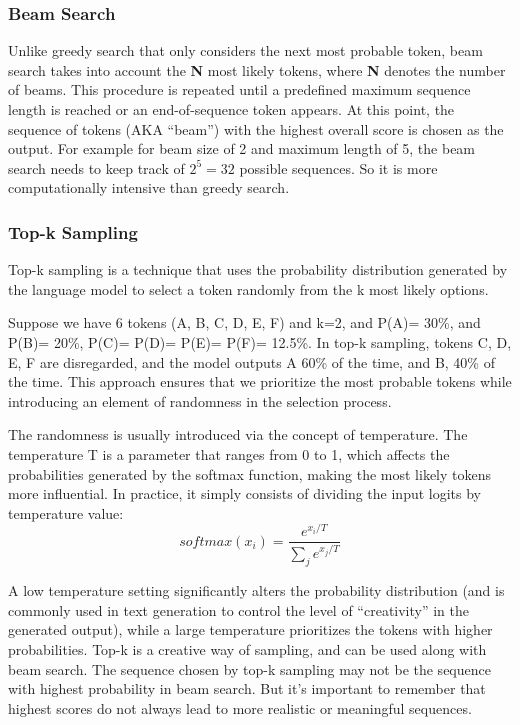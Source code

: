 \documentclass[conference]{IEEEtran}
\begin{document}
\subsubsection{\textbf{Beam Search}}
Unlike greedy search that only considers the next most probable token, beam search takes into account the \textbf{N} most likely tokens, where \textbf{N} denotes the number of beams. This procedure is repeated until a predefined maximum sequence length is reached or an end-of-sequence token appears. At this point, the sequence of tokens (AKA “beam”) with the highest overall score is chosen as the output.
For example for beam size of 2 and maximum length of 5, the beam search needs to keep track of $2^5=32$ possible sequences. So it is more computationally intensive than greedy search.


\subsubsection{\textbf{Top-k Sampling}}
Top-k sampling is a technique that uses the probability distribution generated by the language model to select a token randomly from the k most likely options. 

Suppose we have 6 tokens (A, B, C, D, E, F) and k=2, and P(A)= 30\%, and P(B)= 20\%, P(C)= P(D)= P(E)= P(F)= 12.5\%. In top-k sampling, tokens C, D, E, F are disregarded, and the model outputs A 60\% of the time, and B, 40\% of the time.
This approach ensures that we prioritize the most probable tokens while introducing an element of randomness in the selection process.

The randomness is usually introduced via the concept of temperature. The temperature T is a parameter that ranges from 0 to 1, which affects the probabilities generated by the softmax function, making the most likely tokens more influential. In practice, it simply consists of dividing the input logits by temperature value: 
\begin{equation}
    softmax(x_i)= \frac{e^{x_i/T}}{\sum_j e^{x_j/T}}
\end{equation}

A low temperature setting significantly alters the probability distribution (and is commonly used in text generation to control the level of “creativity” in the generated output), while a large temperature prioritizes the tokens with higher probabilities. 
Top-k is a creative way of sampling, and can be used along with beam search.
The sequence chosen by top-k sampling may not be the sequence with highest probability in beam search. But it’s important to remember that highest scores do not always lead to more realistic or meaningful sequences.
\end{document}
